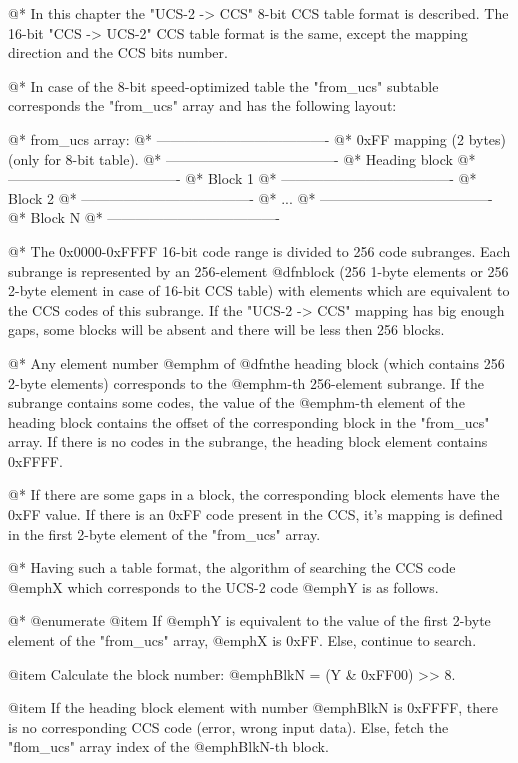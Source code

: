 @*
In this chapter the "UCS-2 -> CCS" 8-bit CCS table format is described. The
16-bit "CCS -> UCS-2" CCS table format is the same, except the mapping
direction and the CCS bits number.

@*
In case of the 8-bit speed-optimized table the "from_ucs" subtable
corresponds the "from_ucs" array and has the following layout:

@*
from_ucs array:
@*
-------------------------------------
@*
0xFF mapping (2 bytes) (only for
8-bit table).
@*
-------------------------------------
@*
Heading block
@*
-------------------------------------
@*
Block 1
@*
-------------------------------------
@*
Block 2
@*
-------------------------------------
@*
  ...
@*
-------------------------------------
@*
Block N
@*
-------------------------------------

@*
The 0x0000-0xFFFF 16-bit code range is divided to 256 code subranges. Each
subrange is represented by an 256-element @dfn{block} (256 1-byte
elements or 256 2-byte element in case of 16-bit CCS table) with
elements which are equivalent to the CCS codes of this subrange.
If the "UCS-2 -> CCS" mapping has big enough gaps, some blocks will be
absent and there will be less then 256 blocks.

@*
Any element number @emph{m} of @dfn{the heading block} (which contains
256 2-byte elements) corresponds to the @emph{m}-th 256-element subrange.
If the subrange contains some codes, the value of the @emph{m}-th element of
the heading block contains the offset of the corresponding block in the
"from_ucs" array. If there is no codes in the subrange, the heading
block element contains 0xFFFF.

@*
If there are some gaps in a block, the corresponding block elements have
the 0xFF value. If there is an 0xFF code present in the CCS, it's mapping
is defined in the first 2-byte element of the "from_ucs" array.

@*
Having such a table format, the algorithm of searching the CCS code
@emph{X} which corresponds to the UCS-2 code @emph{Y} is as follows.

@*
@enumerate
@item If @emph{Y} is equivalent to the value of the first 2-byte element
of the "from_ucs" array, @emph{X} is 0xFF. Else, continue to search.

@item Calculate the block number: @emph{BlkN = (Y & 0xFF00) >> 8}.

@item If the heading block element with number @emph{BlkN} is 0xFFFF, there
is no corresponding CCS code (error, wrong input data). Else, fetch the
"flom_ucs" array index of the @emph{BlkN}-th block.


